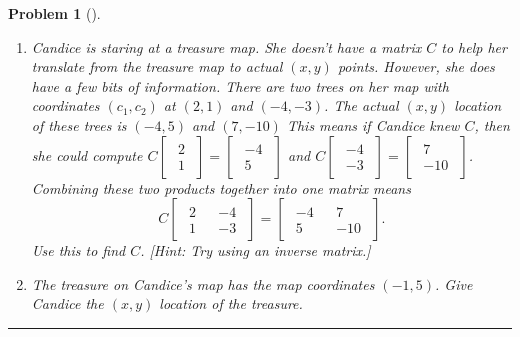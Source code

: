 \documentclass[letterpaper,oneside]{book}%
\theoremstyle{plain}
\theoremstyle{box}
\theoremstyle{problem}
\newtheorem{problemnum}{Problem}[chapter]
\newenvironment{problem}[1][]{\begin{problemnum}[#1]}{\end{problemnum}\nopagebreak\hrule\bigskip}
\newcommand{\nvec}[1]{\begin{matrix} #1 \end{matrix}}
\newcommand{\bvec}[1]{\begin{bmatrix} #1 \end{bmatrix}}
\begin{document}
\begin{problem}
\begin{enumerate}
 
  \item 
 Candice is staring at a treasure map.  She doesn't have a matrix $C$ to help her translate from the treasure map to actual $(x,y)$ points. However, she does have a few bits of information. There are two trees on her map with coordinates $(c_1,c_2)$ at $(2,1)$ and $(-4,-3)$. The actual $(x,y)$ location of these trees is $(-4,5)$ and $(7,-10)$  This means if Candice knew $C$, then she could compute $C\bvec{\nvec{2\\1}}=\bvec{\nvec{-4\\5}}$ and $C\bvec{\nvec{-4\\-3}}=\bvec{\nvec{7\\-10}}$.  Combining these two products together into one matrix means $$C\bvec{\nvec{2\\1}&\nvec{-4\\-3}}=\bvec{\nvec{-4\\5}&\nvec{7\\-10}}.$$  Use this to find $C$.  [Hint: Try using an inverse matrix.]
 \item The treasure on Candice's map has the map coordinates $(-1,5)$.  Give Candice the $(x,y)$ location of the treasure.   
 \end{enumerate}

\end{problem}
\end{document}
